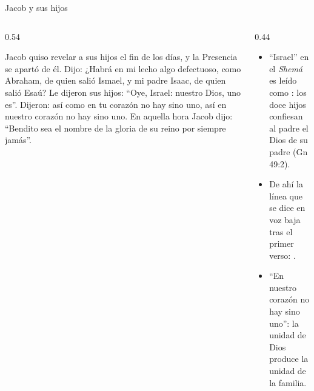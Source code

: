 \begin{frame}{Jacob y sus hijos}
\begin{columns}[t,onlytextwidth]
\begin{column}{0.54\textwidth}
\begin{cita}[colback=dorado!10!papiro,colframe=dorado!80!azul,fontupper=\scriptsize\itshape]Jacob quiso revelar a sus hijos el fin de los días, y la Presencia se apartó de él. Dijo: ¿Habrá en mi lecho algo defectuoso, como Abraham, de quien salió Ismael, y mi padre Isaac, de quien salió Esaú? Le dijeron sus hijos: ``Oye, Israel: \SENOR{} nuestro Dios, \SENOR{} uno es''. Dijeron: así como en tu corazón no hay sino uno, así en nuestro corazón no hay sino uno. En aquella hora Jacob dijo: ``Bendito sea el nombre de la gloria de su reino por siempre jamás''.\end{cita}
\end{column}
\begin{column}{0.44\textwidth}\small
\begin{itemize}
\item ``Israel'' en el \emph{Shemá} es leído como : los doce hijos confiesan al padre el Dios de su padre (Gn 49:2).
\item De ahí la línea que se dice en voz baja tras el primer verso: .
\item ``En nuestro corazón no hay sino uno'': la unidad de Dios produce la unidad de la familia.
\end{itemize}
\end{column}
\end{columns}
\end{frame}

